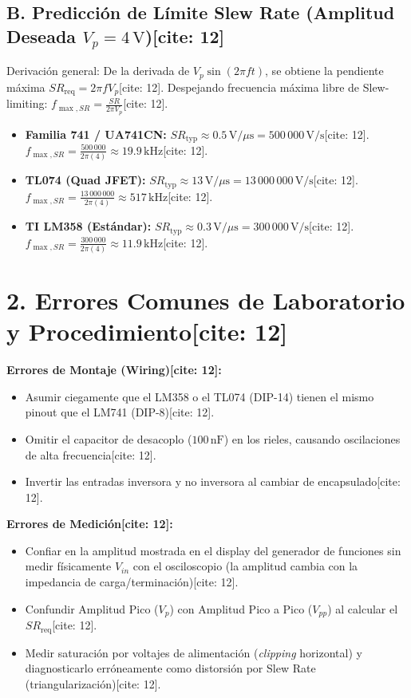 \documentclass[11pt, a4paper]{article}
\begin{document}
\subsection*{B. Predicción de Límite Slew Rate (Amplitud Deseada $V_p=4\,\text{V}$)[cite: 12]}
Derivación general: De la derivada de $V_p\sin(2\pi f t)$, se obtiene la pendiente máxima $SR_{\mathrm{req}} = 2\pi f V_p$[cite: 12]. Despejando frecuencia máxima libre de Slew-limiting: $f_{\max,SR} = \frac{SR}{2\pi V_p}$[cite: 12].
\begin{itemize}
    \item \textbf{Familia 741 / UA741CN:} $SR_{\mathrm{typ}} \approx 0.5\,\text{V}/\mu\text{s} = 500\,000\,\text{V/s}$[cite: 12]. \\
    $f_{\max,SR} = \frac{500\,000}{2\pi(4)} \approx \boxed{19.9\,\text{kHz}}$[cite: 12].
    \item \textbf{TL074 (Quad JFET):} $SR_{\mathrm{typ}} \approx 13\,\text{V}/\mu\text{s} = 13\,000\,000\,\text{V/s}$[cite: 12]. \\
    $f_{\max,SR} = \frac{13\,000\,000}{2\pi(4)} \approx \boxed{517\,\text{kHz}}$[cite: 12].
    \item \textbf{TI LM358 (Estándar):} $SR_{\mathrm{typ}} \approx 0.3\,\text{V}/\mu\text{s} = 300\,000\,\text{V/s}$[cite: 12]. \\
    $f_{\max,SR} = \frac{300\,000}{2\pi(4)} \approx \boxed{11.9\,\text{kHz}}$[cite: 12].
\end{itemize}

\section*{2. Errores Comunes de Laboratorio y Procedimiento[cite: 12]}

\textbf{Errores de Montaje (Wiring)[cite: 12]:}
\begin{itemize}
    \setlength{\itemsep}{0pt}
    \item Asumir ciegamente que el LM358 o el TL074 (DIP-14) tienen el mismo pinout que el LM741 (DIP-8)[cite: 12].
    \item Omitir el capacitor de desacoplo ($100\,\text{nF}$) en los rieles, causando oscilaciones de alta frecuencia[cite: 12].
    \item Invertir las entradas inversora y no inversora al cambiar de encapsulado[cite: 12].
\end{itemize}

\textbf{Errores de Medición[cite: 12]:}
\begin{itemize}
    \setlength{\itemsep}{0pt}
    \item Confiar en la amplitud mostrada en el display del generador de funciones sin medir físicamente $V_{in}$ con el osciloscopio (la amplitud cambia con la impedancia de carga/terminación)[cite: 12].
    \item Confundir Amplitud Pico ($V_p$) con Amplitud Pico a Pico ($V_{pp}$) al calcular el $SR_{\mathrm{req}}$[cite: 12].
    \item Medir saturación por voltajes de alimentación (\textit{clipping} horizontal) y diagnosticarlo erróneamente como distorsión por Slew Rate (triangularización)[cite: 12].
\end{itemize}
\end{document}
